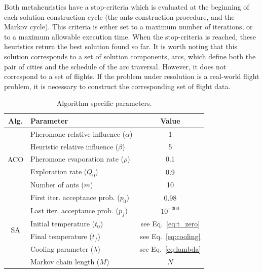 Both metaheuristics have a stop-criteria which is evaluated at the beginning of each solution construction cycle (the ants construction procedure, and the Markov cycle). This criteria is either set to a maximum number of iterations, or to a maximum allowable execution time. When the stop-criteria is reached, these heuristics return the best solution found so far. It is worth noting that this solution corresponds to a set of solution components, arcs, which define both the pair of cities and the schedule of the arc traversal. However, it does not correspond to a set of flights. If the problem under resolution is a real-world flight problem, it is necessary to construct the corresponding set of flight data.


\begin{table}[t]
\centering
\caption{Algorithm specific parameters.}
\label{tab:parameters}
\begin{tabular}{c l c}
\hline
Alg.    &           Parameter         &       Value \\ \hline
\multirow{5}{*}{ACO}    &           Pheromone relative influence ($\alpha$)              &         1 \\
                        &           Heuristic relative influence ($\beta$)               &         5 \\
                        &           Pheromone evaporation rate ($\rho$)                  &       0.1 \\
                        &           Exploration rate ($Q_0$)                  &       0.9 \\ 
                        &           Number of ants ($m$)                     & 10 \\ \hline
\multirow{6}{*}{SA}     &           First iter. acceptance prob. ($p_0$)                   & 0.98  \\ 
                        &           Last iter. acceptance prob. ($p_f$)                   & $10^{-300}$  \\
                        &           Initial temperature ($t_0$)                   & see Eq.~\ref{eq:t_zero} \\
                        &           Final temperature ($t_f$)                   & see Eq.~\ref{eq:cooling}  \\
                        &           Cooling parameter ($\lambda$)               & see Eq.~\ref{eq:lambda} \\
                        &           Markov chain length ($M$)                     & $N$ \\ \hline
                         
\end{tabular}
\end{table}

